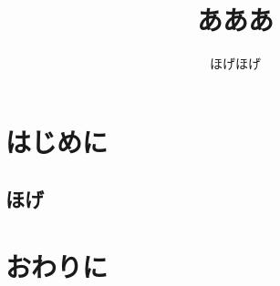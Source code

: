 \documentclass{subfiles}
\author{ほげほげ}
\title{あああ}
\begin{document}
\maketitle
\section{はじめに}
\subsection{ほげ}
\section{おわりに}
\end{document}
